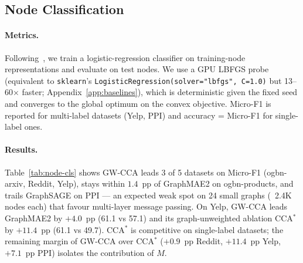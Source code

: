 \documentclass{article}
\begin{document}
\subsection{Node Classification}
\paragraph{Metrics.}
Following~\citet{hamilton2017inductive}, we train a logistic-regression
classifier on training-node representations and evaluate on test nodes. We
use a GPU LBFGS probe (equivalent to \texttt{sklearn}'s
\texttt{LogisticRegression(solver="lbfgs", C=1.0)} but 13--60$\times$ faster;
Appendix~\ref{app:baselines}), which is deterministic given the fixed seed
and converges to the global optimum on the convex objective. Micro-F1 is
reported for multi-label datasets (Yelp, PPI) and accuracy = Micro-F1 for
single-label ones.

\paragraph{Results.}
Table~\ref{tab:node-cls} shows GW-CCA leads 3 of 5 datasets on Micro-F1
(ogbn-arxiv, Reddit, Yelp), stays within $1.4$~pp of GraphMAE2 on
ogbn-products, and trails GraphSAGE on PPI --- an expected weak spot on
24 small graphs (~2.4K nodes each) that favour multi-layer message
passing. On Yelp, GW-CCA leads GraphMAE2 by $+4.0$~pp (61.1 vs 57.1)
and its graph-unweighted ablation CCA$^\ast$ by $+11.4$~pp (61.1 vs
49.7). CCA$^\ast$ is competitive on single-label datasets; the
remaining margin of GW-CCA over CCA$^\ast$ ($+0.9$~pp Reddit,
$+11.4$~pp Yelp, $+7.1$~pp PPI) isolates the contribution of $M$.
\end{document}
